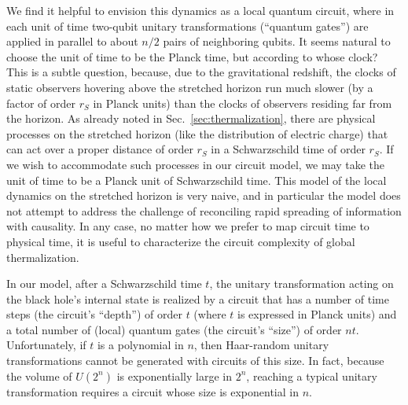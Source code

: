 \documentclass[12pt]{article}
\begin{document}
We find it helpful to envision this dynamics as a local quantum circuit, where in each unit of time two-qubit unitary transformations (``quantum gates'') are applied in parallel to about $n/2$ pairs of neighboring qubits. It seems natural to choose the unit of time to be the Planck time, but according to whose clock? This is a subtle question, because, due to the gravitational redshift, the clocks of static observers hovering above the stretched horizon run much slower (by a factor of order $r_S$ in Planck units) than the clocks of observers residing far from the horizon. As already noted in Sec.~\ref{sec:thermalization}, there are physical processes on the stretched horizon (like the distribution of electric charge) that can act over a proper distance of order $r_S$ in a Schwarzschild time of order $r_S$. If we wish to accommodate such processes in our circuit model, we may take the unit of time to be a Planck unit of Schwarzschild time. This model of the local dynamics on the stretched horizon is very naive, and in particular the model does not attempt to address the challenge of reconciling rapid spreading of information with causality. In any case, no matter how we prefer to map circuit time to physical time, it is useful to characterize the circuit complexity of global thermalization. 

In our model, after a Schwarzschild time $t$, the unitary transformation acting on the black hole's internal state is realized by a circuit that has a number of time steps (the circuit's ``depth'') of order $t$ (where $t$ is expressed in Planck units) and a total number of (local) quantum gates (the circuit's ``size'') of order $nt$. Unfortunately, if $t$ is a polynomial in $n$, then Haar-random unitary transformations cannot be generated with circuits of this size. In fact, because the volume of $U(2^n)$ is exponentially large in $2^n$, reaching a typical unitary transformation requires a circuit whose size is exponential in $n$. 
\end{document}
